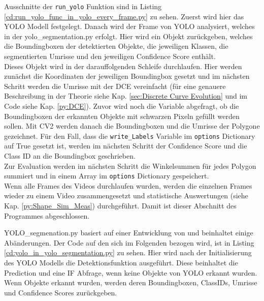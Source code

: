 {	\ifimportant Ausschnitte der \lstinline|run_yolo| Funktion sind in Listing \ref{cd:run_yolo_func_in_yolo_every_frame.py} zu sehen. \fi Zuerst wird hier das YOLO Modell festgelegt. Danach wird der Frame von YOLO analysiert, welches in der yolo\_segmentation.py erfolgt. Hier wird ein Objekt zurückgeben, welches die Boundingboxen der detektierten Objekte, die jeweiligen Klassen, die segmentierten Umrisse und den jeweiligen Confidence Score enthält. \\
	Dieses Objekt wird in der darauffolgenden Schleife durchlaufen. Hier werden zunächst die Koordinaten der jeweiligen Boundingbox gesetzt und im nächsten Schritt werden die Umrisse mit der DCE vereinfacht (für eine genauere Beschreibung in der Theorie siehe Kap. \ref{sec:Discrete Curve Evolution} und im Code siehe Kap. \ref{py:DCE}). 
	Zuvor wird noch die Variable abgefragt, ob die Boundingboxen der erkannten Objekte mit schwarzen Pixeln gefüllt werden sollen. Mit CV2 werden danach die Boundingboxen und die Umrisse der Polygone gezeichnet. Für den Fall, dass die \lstinline|write_Labels| Variable im \lstinline|options| Dictionary auf True gesetzt ist, werden im nächsten Schritt der Confidence Score und die Class ID an die Boundingbox geschrieben. \\
	Zur Evaluation werden im nächsten Schritt die Winkelsummen für jedes Polygon summiert und in einem Array im \lstinline|options| Dictionary gespeichert. \\
	Wenn alle Frames des Videos durchlaufen wurden, werden die einzelnen Frames wieder zu einem Video zusammengesetzt und statistische Auswertungen (siehe Kap. \ref{py:Shape_Sim_Meas}) durchgeführt. Damit ist dieser Abschnitt des Programmes abgeschlossen.

	\ifimportant
	
	\fi

	YOLO\_segmenation.py basiert auf einer Entwicklung von \citeauthor{Canu_pysource} \citep{Canu_pysource} und beinhaltet einige Abänderungen. \ifimportant Der Code auf den sich im Folgenden bezogen wird, ist in Listing \ref{cd:yolo_in_yolo_segmentation.py} zu sehen. \fi Hier wird nach der Initialisierung des YOLO Modells die Detektionsfunktion ausgeführt. Diese beinhaltet die Prediction und eine IF Abfrage, wenn keine Objekte von YOLO erkannt wurden. Wenn Objekte erkannt wurden, werden deren Boundingboxen, ClassIDs, Umrisse und Confidence Scores zurückgeben. 
	}

